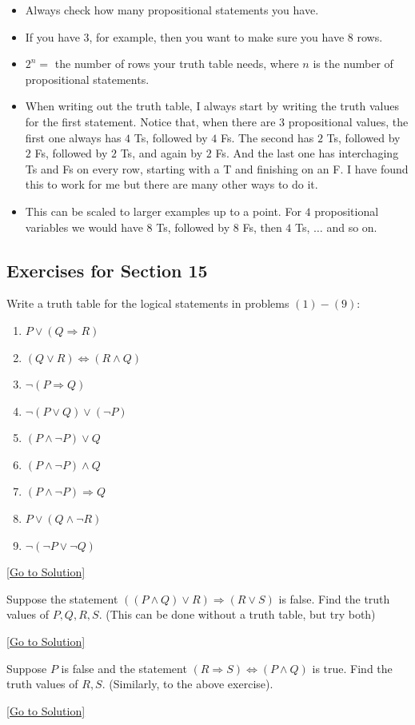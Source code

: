 \begin{itemize}
    \item Always check how many propositional statements you have. 
    \item If you have $3$, for example, then you want to make sure you have $8$ rows. 
    \item $2^{n}=$ the number of rows your truth table needs, where $n$ is the number of propositional statements.
    \item When writing out the truth table, I always start by writing the truth values for the first statement. Notice that, when there are $3$ propositional values, the first one always has $4$ Ts, followed by $4$ Fs. The second has $2$ Ts, followed by $2$ Fs, followed by $2$ Ts, and again by $2$ Fs. And the last one has interchaging Ts and Fs on every row, starting with a T and finishing on an F. I have found this to work for me but there are many other ways to do it. 
    \item This can be scaled to larger examples up to a point. For $4$ propositional variables we would have $8$ Ts, followed by $8$ Fs, then $4$ Ts, $\dots$ and so on. 
\end{itemize}

\subsection{Exercises for Section 15}
\begin{exercise}\label{ex:2.15.1}
    Write a truth table for the logical statements in problems $(1)-(9)$:
    \begin{enumerate}
        \item $P\lor (Q\Rightarrow R)$
        \item $(Q\lor R)\Leftrightarrow(R\land Q)$
        \item $\neg(P\Rightarrow Q)$
        \item $\neg(P\lor Q)\lor (\neg P)$
        \item $(P\land \neg P)\lor Q$
        \item $(P\land \neg P)\land Q$
        \item $(P\land\neg P)\Rightarrow Q$
        \item $P\lor (Q\land \neg R)$
        \item $\neg(\neg P \lor \neg Q)$
    \end{enumerate}
\end{exercise}\hyperref[sol:2.15.1]{[Go to Solution]}

\begin{exercise}\label{ex:2.15.2}
    Suppose the statement $((P\land Q)\lor R)\Rightarrow (R\lor S)$ is false. Find the truth values of $P,Q,R,S$. (This can be done without a truth table, but try both)
\end{exercise}\hyperref[sol:2.15.2]{[Go to Solution]}

\begin{exercise}\label{ex:2.15.3}
    Suppose $P$ is false and the statement $(R\Rightarrow S)\Leftrightarrow (P\land Q)$ is true. Find the truth values of $R,S$. (Similarly, to the above exercise).
\end{exercise}\hyperref[sol:2.15.3]{[Go to Solution]}